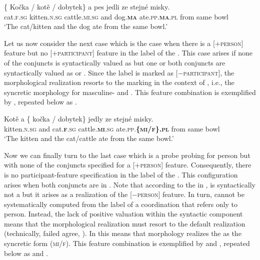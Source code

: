 \documentclass[output=paper,modfontsnewtxmath,hidelinks]{langscibook}
\begin{document}
\newpage 
\ea\gll \{\hspace{-2pt} Kočka / kotě / dobytek\} a pes jedli ze stejné misky.\label{baseline-anim-rep}\\
{} cat.\textsc{f.sg} {} kitten.\textsc{n.sg} {} cattle.\textsc{mi.sg} and dog.\textsc{\textbf{ma}} ate.\textsc{pp.\textbf{ma}.pl} from same bowl\\
\glt `The cat/kitten and the dog ate from the same bowl.'\\\hfill {}
\z

\noindent Let us now consider the next case which is the case when there is a [$+$\textsc{person}] feature but no [$+$\textsc{participant}] feature in the label of the . This case arises if none of the conjuncts is syntactically valued as   but one or both conjuncts are syntactically valued as   or . Since the label is marked as [$-$\textsc{participant}], the morphological realization resorts to the  marking in the context of , i.e., the syncretic morphology for masculine-  and  . This feature combination is exemplified by , repeated below as .

\ea\gll Kotě a \{\hspace{-2pt} kočka / dobytek\} jedly ze stejné misky.\label{baseline-inanim-rep}\\
kitten.\textsc{n.sg} and {} cat.\textsc{\textbf{f}.sg} {} cattle.\textsc{\textbf{mi}.sg} ate.\textsc{pp.\textbf{\{mi/f\}.pl}} from same bowl\\
\glt `The kitten and the cat/cattle ate from the same bowl.'\\\hfill{}
\z

\noindent Now we can finally turn to the last case which is a probe probing for person but with none of the conjuncts specified for a [$+$\textsc{person}] feature. Consequently, there is no participant-feature specification in the label of the . This configuration arises when both conjuncts are in . Note that according to the  in ,  is syntactically not a  but it arises as a realization of the [$-$\textsc{person}] feature.  In turn,   cannot be systematically computed from the label of a coordination that refers only to person. Instead, the lack of positive valuation  within the syntactic component means that the morphological realization must resort to the default  realization (technically, failed agree, \citealt{Preminger2009}). In  this means that  morphology realizes the  as the syncretic   form (\textsc{mi/f}). This feature combination is exemplified by  and , repeated below as  and .
\end{document}
